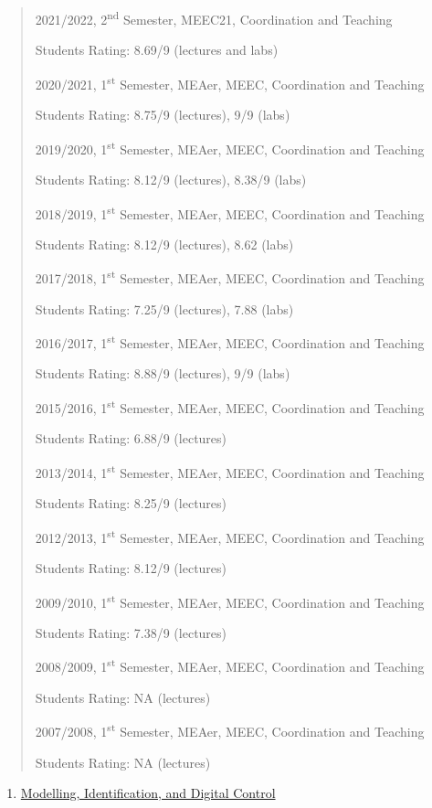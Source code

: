 \documentclass[
]{article}
\begin{document}
\begin{quote}
2021/2022, 2\textsuperscript{nd} Semester, MEEC21, Coordination and
Teaching

Students Rating: 8.69/9 (lectures and labs)

2020/2021, 1\textsuperscript{st} Semester, MEAer, MEEC, Coordination and
Teaching

Students Rating: 8.75/9 (lectures), 9/9 (labs)

2019/2020, 1\textsuperscript{st} Semester, MEAer, MEEC, Coordination and
Teaching

Students Rating: 8.12/9 (lectures), 8.38/9 (labs)

2018/2019, 1\textsuperscript{st} Semester, MEAer, MEEC, Coordination and
Teaching

Students Rating: 8.12/9 (lectures), 8.62 (labs)

2017/2018, 1\textsuperscript{st} Semester, MEAer, MEEC, Coordination and
Teaching

Students Rating: 7.25/9 (lectures), 7.88 (labs)

2016/2017, 1\textsuperscript{st} Semester, MEAer, MEEC, Coordination and
Teaching

Students Rating: 8.88/9 (lectures), 9/9 (labs)

2015/2016, 1\textsuperscript{st} Semester, MEAer, MEEC, Coordination and
Teaching

Students Rating: 6.88/9 (lectures)

2013/2014, 1\textsuperscript{st} Semester, MEAer, MEEC, Coordination and
Teaching

Students Rating: 8.25/9 (lectures)

2012/2013, 1\textsuperscript{st} Semester, MEAer, MEEC, Coordination and
Teaching

Students Rating: 8.12/9 (lectures)

2009/2010, 1\textsuperscript{st} Semester, MEAer, MEEC, Coordination and
Teaching

Students Rating: 7.38/9 (lectures)

2008/2009, 1\textsuperscript{st} Semester, MEAer, MEEC, Coordination and
Teaching

Students Rating: NA (lectures)

2007/2008, 1\textsuperscript{st} Semester, MEAer, MEEC, Coordination and
Teaching

Students Rating: NA (lectures)
\end{quote}

\begin{enumerate}
\def\labelenumi{\arabic{enumi}.}
\setcounter{enumi}{2}
\item
  \ul{Modelling, Identification, and Digital Control}
\end{enumerate}
\end{document}
